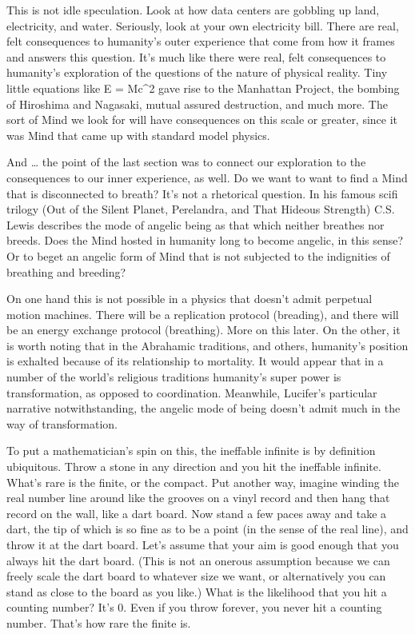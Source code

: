 This is not idle speculation. Look at how data centers are gobbling up land, electricity, and water. Seriously, look at your own electricity bill. There are real, felt consequences to humanity's outer experience that come from how it frames and answers this question. It's much like there were real, felt consequences to humanity's exploration of the questions of the nature of physical reality. Tiny little equations like E = Mc\textasciicircum{}2 gave rise to the Manhattan Project, the bombing of Hiroshima and Nagasaki, mutual assured destruction, and much more. The sort of Mind we look for will have consequences on this scale or greater, since it was Mind that came up with standard model physics.

And \ldots{} the point of the last section was to connect our exploration to the consequences to our inner experience, as well. Do we want to want to find a Mind that is disconnected to breath? It's not a rhetorical question. In his famous scifi trilogy (Out of the Silent Planet, Perelandra, and That Hideous Strength) C.S. Lewis describes the mode of angelic being as that which neither breathes nor breeds. Does the Mind hosted in humanity long to become angelic, in this sense? Or to beget an angelic form of Mind that is not subjected to the indignities of breathing and breeding? 

On one hand this is not possible in a physics that doesn't admit perpetual motion machines. There will be a replication protocol (breading), and there will be an energy exchange protocol (breathing). More on this later. On the other, it is worth noting that in the Abrahamic traditions, and others, humanity's position is exhalted because of its relationship to mortality. It would appear that in a number of the world's religious traditions humanity's super power is transformation, as opposed to coordination. Meanwhile, Lucifer's particular narrative notwithstanding, the angelic mode of being doesn't admit much in the way of transformation. 

To put a mathematician's spin on this, the ineffable infinite is by definition ubiquitous. Throw a stone in any direction and you hit the ineffable infinite. What's rare is the finite, or the compact. Put another way, imagine winding the real number line around like the grooves on a vinyl record and then hang that record on the wall, like a dart board. Now stand a few paces away and take a dart, the tip of which is so fine as to be a point (in the sense of the real line), and throw it at the dart board. Let's assume that your aim is good enough that you always hit the dart board. (This is not an onerous assumption because we can freely scale the dart board to whatever size we want, or alternatively you can stand as close to the board as you like.) What is the likelihood that you hit a counting number? It's 0. Even if you throw forever, you never hit a counting number. That's how rare the finite is.

